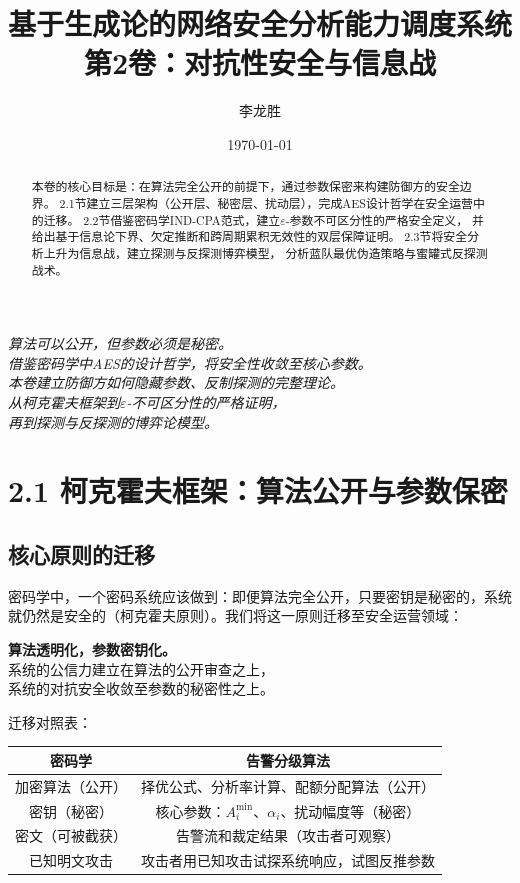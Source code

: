 \documentclass[11pt,a4paper]{article}
\title{基于生成论的网络安全分析能力调度系统\\
第2卷：对抗性安全与信息战}
\author{李龙胜}
\date{\today}
\begin{document}
\maketitle

\begin{center}
\textit{
算法可以公开，但参数必须是秘密。\\
借鉴密码学中AES的设计哲学，将安全性收敛至核心参数。\\
本卷建立防御方如何隐藏参数、反制探测的完整理论。\\
从柯克霍夫框架到$\varepsilon$-不可区分性的严格证明，\\
再到探测与反探测的博弈论模型。\\
}
\end{center}

\vspace{5mm}

\begin{abstract}
本卷的核心目标是：在算法完全公开的前提下，通过参数保密来构建防御方的安全边界。
2.1节建立三层架构（公开层、秘密层、扰动层），完成AES设计哲学在安全运营中的迁移。
2.2节借鉴密码学IND-CPA范式，建立$\varepsilon$-参数不可区分性的严格安全定义，
并给出基于信息论下界、欠定推断和跨周期累积无效性的双层保障证明。
2.3节将安全分析上升为信息战，建立探测与反探测博弈模型，
分析蓝队最优伪造策略与蜜罐式反探测战术。
\end{abstract}

\tableofcontents

\section{2.1 柯克霍夫框架：算法公开与参数保密}

\subsection{核心原则的迁移}

密码学中，一个密码系统应该做到：即便算法完全公开，只要密钥是秘密的，系统就仍然是安全的（柯克霍夫原则）。我们将这一原则迁移至安全运营领域：

\begin{center}
\textbf{算法透明化，参数密钥化。}\\
系统的公信力建立在算法的公开审查之上，\\
系统的对抗安全收敛至参数的秘密性之上。
\end{center}

迁移对照表：
\begin{center}
\begin{tabular}{c|c}
\toprule
\textbf{密码学} & \textbf{告警分级算法} \\
\midrule
加密算法（公开） & 择优公式、分析率计算、配额分配算法（公开） \\
密钥（秘密） & 核心参数：$A_i^{\min}$、$\alpha_i$、扰动幅度等（秘密） \\
密文（可被截获） & 告警流和裁定结果（攻击者可观察） \\
已知明文攻击 & 攻击者用已知攻击试探系统响应，试图反推参数 \\
\bottomrule
\end{tabular}
\end{center}
\end{document}
